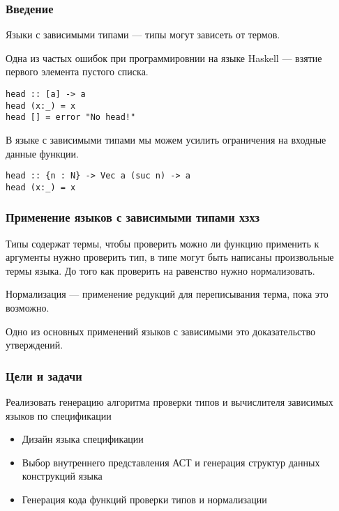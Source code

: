 
\begin{frame}[fragile]
\frametitle{Введение}

Языки с зависимыми типами --- типы могут зависеть от термов.

Одна из частых ошибок при программировнии на языке Haskell --- взятие первого элемента пустого списка.

\begin{verbatim}
head :: [a] -> a
head (x:_) = x
head [] = error "No head!"
\end{verbatim}

В языке с зависимыми типами мы можем усилить ограничения на входные данные функции.

\begin{verbatim}
head :: {n : N} -> Vec a (suc n) -> a
head (x:_) = x
\end{verbatim}

\end{frame}

\begin{frame}
\frametitle{Применение языков с зависимыми типами хзхз}
Типы содержат термы, чтобы проверить можно ли функцию применить к аргументы нужно проверить тип, в типе могут быть написаны произвольные термы языка. До того как проверить на равенство нужно нормализовать.

Нормализация --- применение редукций для переписывания терма, пока это возможно.

Одно из основных применений языков с зависимыми это доказательство утверждений.

\end{frame}

\begin{frame}
\frametitle{Цели и задачи}
Реализовать генерацию алгоритма проверки типов и вычислителя зависимых языков по спецификации

\begin{itemize}
\item Дизайн языка спецификации
\item Выбор внутреннего представления АСТ и генерация структур данных конструкций языка
\item Генерация кода функций проверки типов и нормализации
\end{itemize}
\end{frame}

